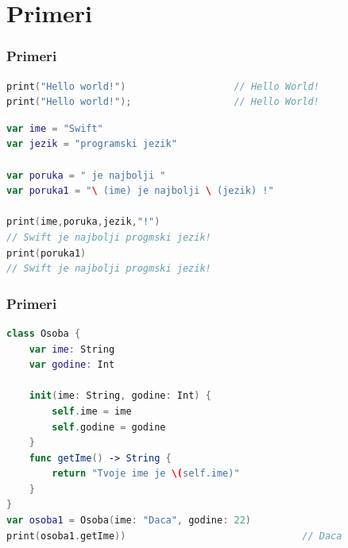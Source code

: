 \documentclass{beamer}
\begin{document}
\section{Primeri}
\begin{frame}[fragile]
\frametitle{Primeri}

\begin{lstlisting}[language=Swift, caption={Ispis teksta},frame=single, label=simple]
print("Hello world!")				    // Hello World!
print("Hello world!");					// Hello World!
\end{lstlisting}

\begin{lstlisting}[language=Swift, caption={Stringovi i konkatenacija stringova},frame=single, label=simple]
var ime = "Swift"
var jezik = "programski jezik"

var poruka = " je najbolji "
var poruka1 = "\ (ime) je najbolji \ (jezik) !" 

print(ime,poruka,jezik,"!")
// Swift je najbolji progmski jezik!
print(poruka1) 
// Swift je najbolji progmski jezik!
\end{lstlisting}

\end{frame}


\begin{frame}[fragile]
\frametitle{Primeri}

\begin{lstlisting}[language=Swift, caption={Klasa},frame=single, label=simple]
class Osoba {
    var ime: String
    var godine: Int
    
    init(ime: String, godine: Int) {
        self.ime = ime
        self.godine = godine
    }
    func getIme() -> String {
        return "Tvoje ime je \(self.ime)"
	}
}
var osoba1 = Osoba(ime: "Daca", godine: 22)
print(osoba1.getIme))								// Daca
\end{lstlisting}


\end{frame}

\end{document}
